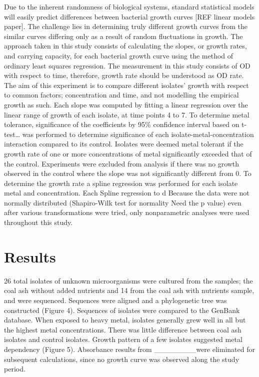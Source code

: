 \documentclass[ms]{uncgdissertationexp}
\theoremstyle{plain}
\theoremstyle{definition}
\theoremstyle{remark}
\begin{document}
  Due to the inherent randomness of biological systems, standard
  statistical models will easily predict differences between bacterial
  growth curves {[}REF linear models paper{]}. The challenge lies in
  determining truly different growth curves from the similar curves
  differing only as a result of random fluctuations in growth. The
  approach taken in this study consists of calculating the slopes, or
  growth rates, and carrying capacity, for each bacterial growth curve
  using the method of ordinary least squares regression. The measurement
  in this study consists of OD with respect to time, therefore, growth
  rate should be understood as OD rate. The aim of this experiment is to
  compare different isolates' growth with respect to common factors;
  concentration and time, and not modelling the empirical growth as such.
  Each slope was computed by fitting a linear regression over the linear
  range of growth of each isolate, at time points 4 to 7. To determine
  metal tolerance, significance of the coefficients by 95\% confidence
  interval based on t-test\ldots{} was performed to determine significance
  of each isolate-metal-concentration interaction compared to its control.
  Isolates were deemed metal tolerant if the growth rate of one or more
  concentrations of metal significantly exceeded that of the control.
  Experiments were excluded from analysis if there was no growth observed
  in the control where the slope was not significantly different from 0.
  To determine the growth rate a spline regression was performed for each
  isolate metal and concentration. Each Spline regression to d Because the
  data were not normally distributed (Shapiro-Wilk test for normality Need
  the p value) even after various transformations were tried, only
  nonparametric analyses were used throughout this study.
  
  \section{Results}\label{results-1}
  
  26 total isolates of unknown microorganisms were cultured from the
  samples; the coal ash without added nutrients and 14 from the coal ash
  with nutrients sample, and were sequenced. Sequences were aligned and a
  phylogenetic tree was constructed (Figure 4). Sequences of isolates were
  compared to the GenBank database. When exposed to heavy metal, isolates
  generally grew well in all but the highest metal concentrations. There
  was little difference between coal ash isolates and control isolates.
  Growth pattern of a few isolates suggested metal dependency (Figure 5).
  Absorbance results from \_\_\_\_\_\_\_\_were eliminated for subsequent
  calculations, since no growth curve was observed along the study period.
  
\end{document}
